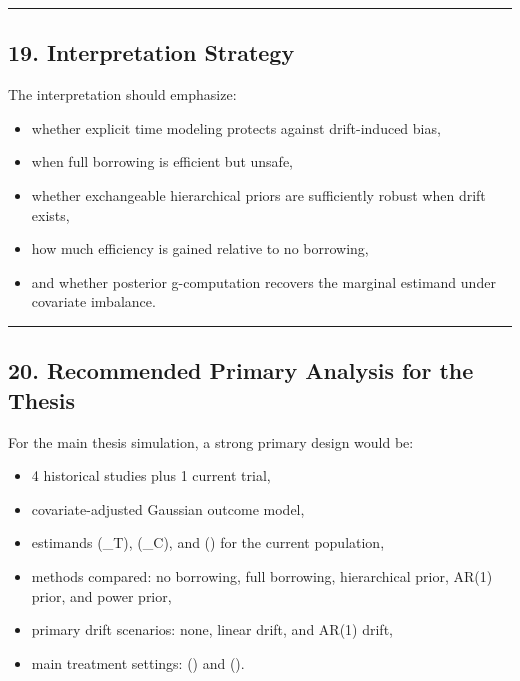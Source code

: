 \documentclass[
  letterpaper,
  DIV=11,
  numbers=noendperiod]{scrartcl}
\providecommand{\tightlist}{%
  \setlength{\itemsep}{0pt}\setlength{\parskip}{0pt}}
\begin{document}
\begin{center}\rule{0.5\linewidth}{0.5pt}\end{center}

\subsection{19. Interpretation Strategy}\label{interpretation-strategy}

The interpretation should emphasize:

\begin{itemize}
\tightlist
\item
  whether explicit time modeling protects against drift-induced bias,
\item
  when full borrowing is efficient but unsafe,
\item
  whether exchangeable hierarchical priors are sufficiently robust when
  drift exists,
\item
  how much efficiency is gained relative to no borrowing,
\item
  and whether posterior g-computation recovers the marginal estimand
  under covariate imbalance.
\end{itemize}

\begin{center}\rule{0.5\linewidth}{0.5pt}\end{center}

\subsection{20. Recommended Primary Analysis for the
Thesis}\label{recommended-primary-analysis-for-the-thesis}

For the main thesis simulation, a strong primary design would be:

\begin{itemize}
\tightlist
\item
  4 historical studies plus 1 current trial,
\item
  covariate-adjusted Gaussian outcome model,
\item
  estimands (\mu\_T), (\mu\_C), and (\Delta) for the current population,
\item
  methods compared: no borrowing, full borrowing, hierarchical prior,
  AR(1) prior, and power prior,
\item
  primary drift scenarios: none, linear drift, and AR(1) drift,
\item
  main treatment settings: () and ().
\end{itemize}
\end{document}
